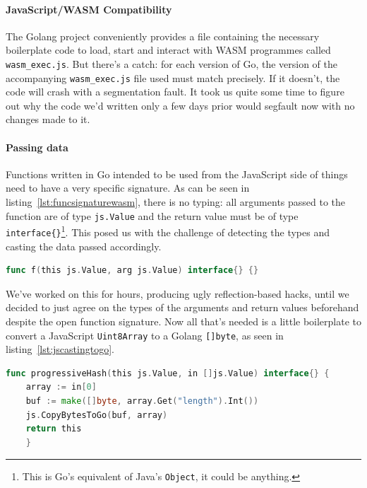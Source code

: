 \paragraph{JavaScript/WASM Compatibility} The Golang project conveniently provides a file containing the necessary boilerplate code to load, start and interact with \gls{WASM} programmes called \texttt{wasm\_exec.js}.
But there's a catch: for each version of Go, the version of the accompanying \texttt{wasm\_exec.js} file used must match precisely.
If it doesn't, the code will crash with a segmentation fault.
It took us quite some time to figure out why the code we'd written only a few days prior would segfault now with no changes made to it.

\paragraph{Passing data} Functions written in Go intended to be used from the JavaScript side of things need to have a very specific signature.
As can be seen in listing~\ref{lst:funcsignaturewasm}, there is no typing: all arguments passed to the function are of type \texttt{js.Value} and the return value must be of type \texttt{interface\{\}}\footnote{This is Go's equivalent of Java's \texttt{Object}, it could be anything.}.
This posed us with the challenge of detecting the types and casting the data passed accordingly.

\begin{lstlisting}[caption={Golang WASM function signature}, captionpos=b, language=Go, label={lst:funcsignaturewasm}]
    func f(this js.Value, arg js.Value) interface{} {}
\end{lstlisting}

We've worked on this for hours, producing ugly reflection-based hacks, until we decided to just agree on the types of the arguments and return values beforehand despite the open function signature.
Now all that's needed is a little boilerplate to convert a JavaScript \texttt{Uint8Array} to a Golang \texttt{[]byte}, as seen in listing~\ref{lst:jscastingtogo}.

\begin{lstlisting}[caption={Uint8Array to {[]}byte}, captionpos=b, language=Go, label={lst:jscastingtogo}, captionpos=b]
    func progressiveHash(this js.Value, in []js.Value) interface{} {
    array := in[0]
    buf := make([]byte, array.Get("length").Int())
    js.CopyBytesToGo(buf, array)
    return this
    }
\end{lstlisting}

